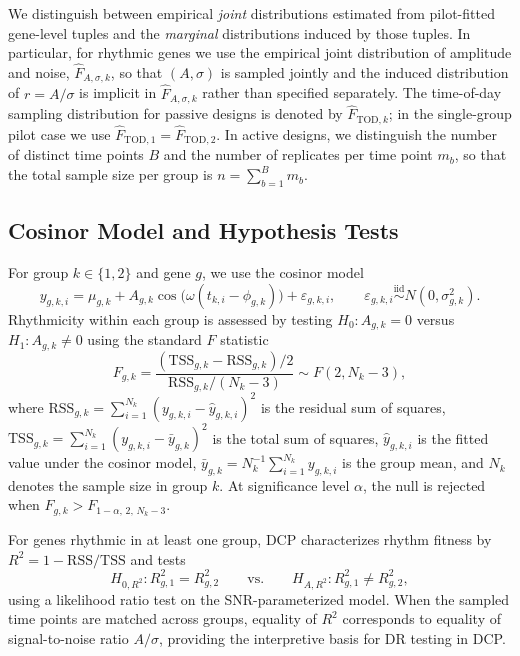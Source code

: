\documentclass{article}
\begin{document}
We distinguish between empirical \emph{joint} distributions estimated from
pilot-fitted gene-level tuples and the \emph{marginal} distributions induced by
those tuples. In particular, for rhythmic genes we use the empirical joint
distribution of amplitude and noise,
$\hat{F}_{A,\sigma,k}$, so that $(A,\sigma)$ is sampled jointly and the
induced distribution of $r=A/\sigma$ is implicit in $\hat{F}_{A,\sigma,k}$
rather than specified separately. The time-of-day sampling distribution for
passive designs is denoted by $\hat{F}_{\mathrm{TOD},k}$; in the single-group
pilot case we use $\hat{F}_{\mathrm{TOD},1}=\hat{F}_{\mathrm{TOD},2}$. In
active designs, we distinguish the number of distinct time points $B$ and the
number of replicates per time point $m_b$, so that the total sample size per
group is $n=\sum_{b=1}^B m_b$.

\subsection{Cosinor Model and Hypothesis Tests}
\label{sec:cosinor_tests}

For group $k\in\{1,2\}$ and gene $g$, we use the cosinor model
\begin{equation}
y_{g,k,i}
=
\mu_{g,k}
+
A_{g,k}\cos\!\bigl(\omega(t_{k,i}-\phi_{g,k})\bigr)
+
\varepsilon_{g,k,i},
\qquad
\varepsilon_{g,k,i}\overset{\text{iid}}{\sim}N(0,\sigma_{g,k}^2).
\label{eq:cosinor_model}
\end{equation}
Rhythmicity within each group is assessed by testing
$H_0:A_{g,k}=0$ versus $H_1:A_{g,k}\neq 0$ using the standard $F$ statistic
\begin{equation}
F_{g,k}
=
\frac{(\mathrm{TSS}_{g,k}-\mathrm{RSS}_{g,k})/2}
{\mathrm{RSS}_{g,k}/(N_k-3)}
\sim F(2,N_k-3),
\label{eq:rhythm_f_test}
\end{equation}
where $\mathrm{RSS}_{g,k}=\sum_{i=1}^{N_k}(y_{g,k,i}-\hat y_{g,k,i})^2$ is the
residual sum of squares, $\mathrm{TSS}_{g,k}=\sum_{i=1}^{N_k}(y_{g,k,i}-\bar
y_{g,k})^2$ is the total sum of squares, $\hat y_{g,k,i}$ is the fitted value
under the cosinor model, $\bar y_{g,k}=N_k^{-1}\sum_{i=1}^{N_k} y_{g,k,i}$ is
the group mean, and $N_k$ denotes the sample size in group $k$.
At significance level $\alpha$, the null is rejected when
$F_{g,k}>F_{1-\alpha,\,2,\,N_k-3}$.

For genes rhythmic in at least one group, DCP characterizes rhythm fitness by
$R^2=1-\mathrm{RSS}/\mathrm{TSS}$ and tests
\begin{equation}
H_{0,R^2}: R_{g,1}^2 = R_{g,2}^2
\qquad \text{vs.} \qquad
H_{A,R^2}: R_{g,1}^2 \neq R_{g,2}^2,
\label{eq:dr_r2_hyp}
\end{equation}
using a likelihood ratio test on the SNR-parameterized model.
When the sampled time points are matched across groups, equality of $R^2$
corresponds to equality of signal-to-noise ratio $A/\sigma$, providing the
interpretive basis for DR testing in DCP.
\end{document}
